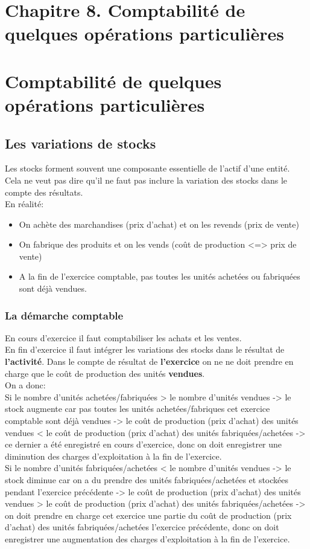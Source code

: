 \documentclass{article}
\begin{document}
\section*{Chapitre 8. Comptabilité de quelques opérations particulières}
\section{Comptabilité de quelques opérations particulières}
\subsection{Les variations de stocks}
Les stocks forment souvent une composante essentielle de l'actif d'une entité. \\
Cela ne veut pas dire qu'il ne faut pas inclure la variation des stocks dans le compte des résultats. \\
En réalité:
\begin{itemize}
    \item On achète des marchandises (prix d'achat) et on les revends (prix de vente)
    \item On fabrique des produits et on les vends (coût de production <=> prix de vente)
    \item A la fin de l'exercice comptable, pas toutes les unités achetées ou fabriquées sont déjà vendues.
\end{itemize}

\subsubsection*{La démarche comptable}
En cours d'exercice il faut comptabiliser les achats et les ventes. \\
En fin d'exercice il faut intégrer les variations des stocks dans le résultat de \textbf{l'activité}. Dans le compte de résultat de \textbf{l'exercice} on ne ne doit prendre en charge que le coût de production des unités \textbf{vendues}.\\
On a donc: \\
Si le nombre d’unités achetées/fabriquées > le nombre d’unités vendues -> le stock augmente car pas toutes les unités achetées/fabriques cet exercice comptable sont déjà vendues -> le coût de production (prix d’achat) des unités vendues < le coût de production (prix d’achat) des unités fabriquées/achetées -> ce dernier a été enregistré en cours d’exercice, donc on doit enregistrer une diminution des charges d’exploitation à la fin de l’exercice. \\
Si le nombre d’unités fabriquées/achetées < le nombre d’unités vendues -> le stock diminue car on a du prendre des unités fabriquées/achetées et stockées pendant l’exercice précédente -> le coût de production (prix d’achat) des unités vendues > le coût de production (prix d’achat) des unités fabriquées/achetées -> on doit prendre en charge cet exercice une partie du coût de production (prix d’achat) des unités fabriquées/achetées l’exercice précédente, donc on doit enregistrer une augmentation des charges d’exploitation à la fin de l’exercice. \\
\end{document}

